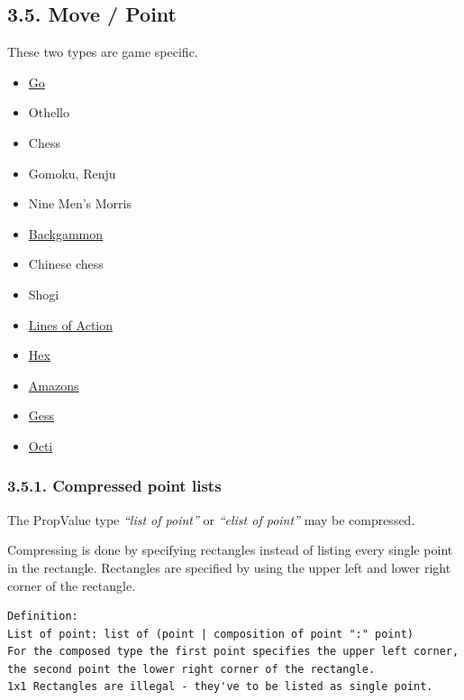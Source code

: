 \subsection{3.5. Move / Point}\label{move-point}

These two types are game specific.

\begin{itemize}
\item
  \href{https://red-bean.com/sgf/go.html\#types}{Go}
\item
  Othello
\item
  Chess
\item
  Gomoku, Renju
\item
  Nine Men's Morris
\item
  \href{https://red-bean.com/sgf/backgammon.html\#types}{Backgammon}
\item
  Chinese chess
\item
  Shogi
\item
  \href{https://red-bean.com/sgf/loa.html\#types}{Lines of Action}
\item
  \href{https://red-bean.com/sgf/hex.html\#types}{Hex}
\item
  \href{https://red-bean.com/sgf/amazons.html\#types}{Amazons}
\item
  \href{https://red-bean.com/sgf/gess.html\#types}{Gess}
\item
  \href{https://red-bean.com/sgf/octi.html\#types}{Octi}
\end{itemize}

\subsubsection{3.5.1. Compressed point
lists}\label{compressed-point-lists}

The PropValue type \emph{``list of point''} or \emph{``elist of point''}
may be compressed.

Compressing is done by specifying rectangles instead of listing every
single point in the rectangle. Rectangles are specified by using the
upper left and lower right corner of the rectangle.

\begin{verbatim}
Definition:
List of point: list of (point | composition of point ":" point)
For the composed type the first point specifies the upper left corner,
the second point the lower right corner of the rectangle.
1x1 Rectangles are illegal - they've to be listed as single point.
\end{verbatim}

